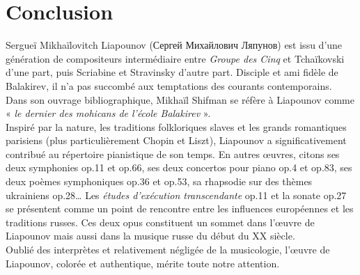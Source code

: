 
\chapter{Conclusion}

Sergueï Mikhaïlovitch Liapounov (\foreignlanguage{russian}{Сергей Михайлович Ляпунов}) est issu d'une génération de compositeurs intermédiaire entre \emph{Groupe des Cinq} et Tchaïkovski d'une part, puis Scriabine et Stravinsky d'autre part. Disciple et ami fidèle de Balakirev, il n'a pas succombé aux temptations des courants contemporains. Dans son ouvrage bibliographique\cite{2}, Mikhaïl Shifman se réfère à Liapounov comme « \emph{le dernier des mohicans de l'école Balakirev} ».\\

Inspiré par la nature, les traditions folkloriques slaves et les grands romantiques parisiens (plus particulièrement Chopin et Liszt), Liapounov a significativement contribué au répertoire pianistique de son temps. En autres œuvres, citons ses deux symphonies op.11 et op.66, ses deux concertos pour piano op.4 et op.83, ses deux poèmes symphoniques op.36 et op.53, sa rhapsodie sur des thèmes ukrainiens op.28\dots{} Les \emph{études d'exécution transcendante} op.11 et la sonate op.27 se présentent comme un point de rencontre entre les influences européennes et les traditions russes. Ces deux opus constituent un sommet dans l'œuvre de Liapounov mais aussi dans la musique russe du début du XX\ieme{} siècle.\\

Oublié des interprètes et relativement négligée de la musicologie, l'œuvre de Liapounov, colorée et authentique, mérite toute notre attention.

